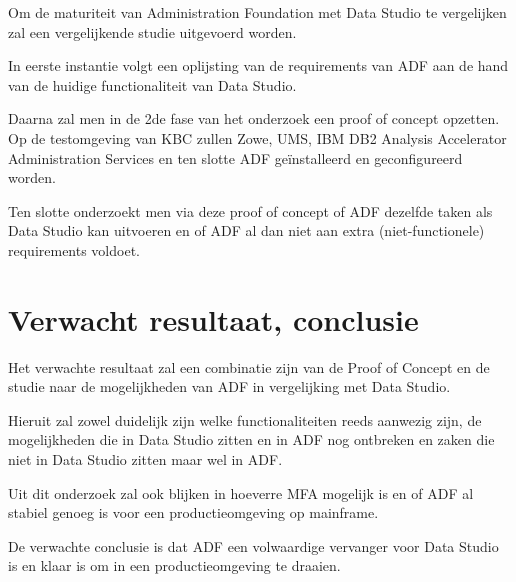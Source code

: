 Om de maturiteit van Administration Foundation met Data Studio te vergelijken zal een vergelijkende studie uitgevoerd worden.

In eerste instantie volgt een oplijsting van de requirements van ADF aan de hand van de huidige functionaliteit van Data Studio.

Daarna zal men in de 2de fase van het onderzoek een proof of concept opzetten. Op de testomgeving van KBC zullen Zowe, UMS, IBM DB2 Analysis Accelerator Administration Services en ten slotte ADF geïnstalleerd en geconfigureerd worden.

Ten slotte onderzoekt men via deze proof of concept of ADF dezelfde taken als Data Studio kan uitvoeren en of ADF al dan niet aan extra (niet-functionele) requirements voldoet.



\section{Verwacht resultaat, conclusie}%
\label{sec:verwachte_resultaten}

Het verwachte resultaat zal een combinatie zijn van de Proof of Concept en de studie naar de mogelijkheden van ADF in vergelijking met Data Studio. 

Hieruit zal zowel duidelijk zijn welke functionaliteiten reeds aanwezig zijn, de mogelijkheden die in Data Studio zitten en in ADF nog ontbreken en zaken die niet in Data Studio zitten maar wel in ADF.

Uit dit onderzoek zal ook blijken in hoeverre MFA mogelijk is en of ADF al stabiel genoeg is voor een productieomgeving op mainframe.

De verwachte conclusie is dat ADF een volwaardige vervanger voor Data Studio is en klaar is om in een productieomgeving te draaien.

